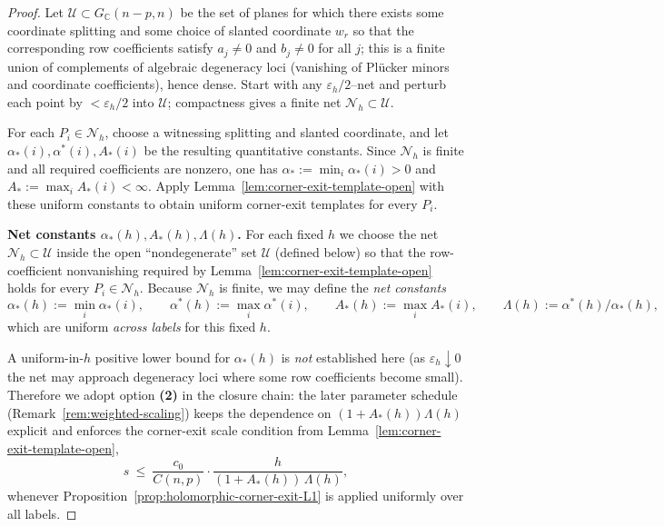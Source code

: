 \documentclass[11pt]{article}
\newcommand{\REVMZ}[1]{\textcolor{teal}{#1}}  %
\numberwithin{equation}{section}  %
\theoremstyle{plain}
\theoremstyle{definition}
\theoremstyle{remark}
\newcommand{\C}{\mathbb{C}}
\begin{document}
\begin{proof}
Let $\mathcal U\subset G_\C(n-p,n)$ be the set of planes for which there exists some coordinate splitting and some choice of slanted coordinate $w_r$
so that the corresponding row coefficients satisfy $a_j\neq 0$ and $b_j\neq 0$ for all $j$; this is a finite union of complements of algebraic
degeneracy loci (vanishing of Pl\"ucker minors \REVMZ{\cite{GH78}} and coordinate coefficients), hence dense.
Start with any $\varepsilon_h/2$--net and perturb each point by $<\varepsilon_h/2$ into $\mathcal U$; compactness gives a finite net $\mathcal N_h\subset\mathcal U$.

\smallskip\noindent
For each $P_i\in\mathcal N_h$, choose a witnessing splitting and slanted coordinate, and let $\alpha_*(i),\alpha^*(i),A_*(i)$ be the resulting quantitative constants.
Since $\mathcal N_h$ is finite and all required coefficients are nonzero, one has $\alpha_*:=\min_i\alpha_*(i)>0$ and $A_*:=\max_iA_*(i)<\infty$.
Apply Lemma~\ref{lem:corner-exit-template-open} with these uniform constants to obtain uniform corner-exit templates for every $P_i$.

\noindent\textbf{Net constants $\alpha_*(h),A_*(h),\Lambda(h)$.}
For each fixed $h$ we choose the net $\mathcal N_h\subset\mathcal U$ inside the open ``nondegenerate'' set $\mathcal U$ (defined below) so that the
row-coefficient nonvanishing required by Lemma~\ref{lem:corner-exit-template-open} holds for every $P_i\in\mathcal N_h$.
Because $\mathcal N_h$ is finite, we may define the \emph{net constants}
\[
\alpha_*(h):=\min_i\alpha_*(i),\qquad 
\alpha^*(h):=\max_i\alpha^*(i),\qquad 
A_*(h):=\max_iA_*(i),\qquad 
\Lambda(h):=\alpha^*(h)/\alpha_*(h),
\]
which are uniform \emph{across labels} for this fixed $h$.

\smallskip\noindent
A uniform-in-$h$ positive lower bound for $\alpha_*(h)$ is \emph{not} established here (as $\varepsilon_h\downarrow0$ the net may approach
degeneracy loci where some row coefficients become small).
Therefore we adopt option \textbf{(2)} in the closure chain:
the later parameter schedule (Remark~\ref{rem:weighted-scaling}) keeps the dependence on $(1+A_*(h))\Lambda(h)$ explicit and enforces the
corner-exit scale condition from Lemma~\ref{lem:corner-exit-template-open},
\[
s\ \le\ \frac{c_0}{C(n,p)}\cdot \frac{h}{(1+A_*(h))\,\Lambda(h)},
\]
whenever Proposition~\ref{prop:holomorphic-corner-exit-L1} is applied uniformly over all labels.


\end{proof}
\end{document}
